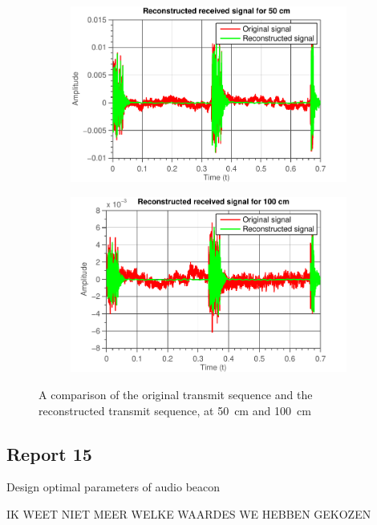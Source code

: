 \documentclass[11pt,titlepage]{report}
\begin{document}
\begin{figure}[H]
	\centering
	\begin{subfigure}{0.49\textwidth}
		\includegraphics[width=\textwidth]{../../deliverable-7-resources/figures/ass-1/report-14-15/ass-1-report-14-50cm-reconstruction.pdf}
	\end{subfigure}
	\begin{subfigure}{0.49\textwidth}
		\includegraphics[width=\textwidth]{../../deliverable-7-resources/figures/ass-1/report-14-15/ass-1-report-14-100cm-reconstruction.pdf}
	\end{subfigure}
	\caption{A comparison of the original transmit sequence and the reconstructed transmit sequence, at \SI{50}{cm} and \SI{100}{cm}}
	\label{fig:rep14-comparison}
\end{figure}


\subsection{Report 15}
Design optimal parameters of audio beacon

IK WEET NIET MEER WELKE WAARDES WE HEBBEN GEKOZEN
\end{document}
